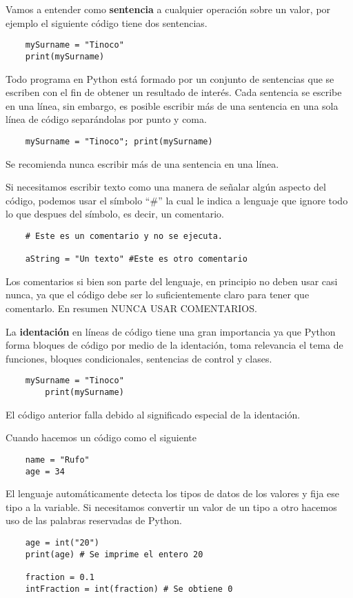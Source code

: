 \documentclass[12pt]{article}
\begin{document}
    Vamos a entender como \textbf{sentencia} a cualquier operación sobre un valor, por ejemplo el siguiente código tiene dos sentencias.
    \begin{lstlisting}
    mySurname = "Tinoco"
    print(mySurname)
    \end{lstlisting}

    Todo programa en Python está formado por un conjunto de sentencias que se escriben con el fin de obtener un resultado de interés.
    Cada sentencia se escribe en una línea, sin embargo, es posible escribir más de una sentencia en una sola línea de
    código separándolas por punto y coma.
    \begin{lstlisting}
    mySurname = "Tinoco"; print(mySurname)
    \end{lstlisting}
    Se recomienda nunca escribir más de una sentencia en una línea.

    Si necesitamos escribir texto como una manera de señalar algún aspecto del código, podemos usar el símbolo ``$\#$''
    la cual le indica a lenguaje que ignore todo lo que despues del símbolo, es decir, un comentario.

    \begin{lstlisting}
    # Este es un comentario y no se ejecuta.

    aString = "Un texto" #Este es otro comentario
    \end{lstlisting}
    Los comentarios si bien son parte del lenguaje, en principio no deben usar casi nunca, ya que el código debe ser lo
    suficientemente claro para tener que comentarlo.
    En resumen NUNCA USAR COMENTARIOS.

    La \textbf{identación} en líneas de código tiene una gran importancia ya que Python forma bloques de código por
    medio de la identación, toma relevancia el tema de funciones, bloques condicionales, sentencias de control y clases.

    \begin{lstlisting}
    mySurname = "Tinoco"
        print(mySurname)
    \end{lstlisting}

    El código anterior falla debido al significado especial de la identación.

    Cuando hacemos un código como el siguiente
    \begin{lstlisting}
    name = "Rufo"
    age = 34
    \end{lstlisting}

    El lenguaje automáticamente detecta los tipos de datos de los valores y fija ese tipo a la variable.
    Si necesitamos convertir un valor de un tipo a otro hacemos uso de las palabras reservadas de Python.
    \begin{lstlisting}
    age = int("20")
    print(age) # Se imprime el entero 20

    fraction = 0.1
    intFraction = int(fraction) # Se obtiene 0
    \end{lstlisting}
\end{document}
